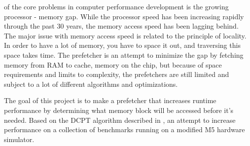  of the core problems in computer performance development is the growing processor - memory gap. While the processor speed has been increasing rapidly through the past 30 years, the memory access speed has been lagging behind. The major issue with memory access speed is related to the principle of locality. In order to have a lot of memory, you have to space it out, and traversing this space takes time. The prefetcher is an attempt to minimize the gap by fetching memory from RAM to cache, memory on the chip, but because of space requirements and limits to complexity, the prefetchers are still limited and subject to a lot of different algorithms and optimizations.

The goal of this project is to make a prefetcher that increases runtime performance by determining what memory block will be accessed before it's needed. Based on the DCPT algorithm described in \cite{reference:jahre}, an attempt to increase performance on a collection of benchmarks running on a modified M5 hardware simulator. 


